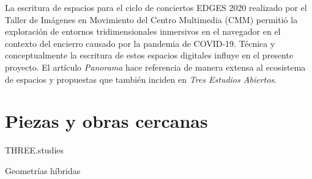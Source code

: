 La escritura de espacios para el ciclo de conciertos EDGES 2020 realizado por el Taller de Imágenes en Movimiento del Centro Multimedia (CMM) permitió la exploración de entornos tridimensionales inmersivos en el navegador en el contexto del encierro causado por la pandemia de COVID-19. Técnica y conceptualmente la escritura de estos espacios digitales influye en el presente proyecto. El artículo \textit{Panorama} \citep{panoramaArticulo} hace referencia de manera extensa al ecosistema de espacios y propuestas que también inciden en \textit{Tres Estudios Abiertos}.


\section{Piezas y obras cercanas}

THREE.studies

Geometrías híbridas 

